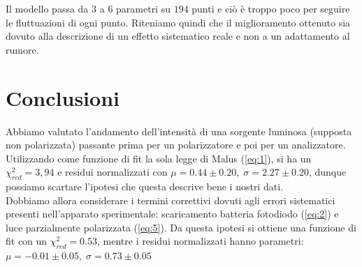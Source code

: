 \documentclass[10pt,twocolumn]{article}
\begin{document}
      \noindent Il modello passa da $3$ a $6$ parametri su $194$ punti e ciò è troppo poco per seguire le fluttuazioni di ogni punto.
      Riteniamo quindi che il miglioramento ottenuto sia dovuto alla descrizione di un effetto sistematico reale e non a un adattamento al rumore.


\section{Conclusioni}
Abbiamo valutato l'andamento dell'intensità di una sorgente luminosa (supposta non polarizzata) passante prima per un polarizzatore e poi per un analizzatore. Utilizzando come funzione di fit la sola legge di Malus (\ref{eq:1}), si ha un $\chi^2_{red} = 3,94$ e residui normalizzati con $\mu = 0.44 \pm 0.20, \; \sigma = 2.27 \pm 0.20$, dunque possiamo scartare l'ipotesi che questa descrive bene i nostri dati. \\
Dobbiamo allora considerare i termini correttivi dovuti agli errori sistematici presenti nell'apparato sperimentale: scaricamento batteria fotodiodo (\ref{eq:2}) e luce parzialmente polarizzata (\ref{eq:5}). Da questa ipotesi si ottiene una funzione di fit con un $\chi^2_{red} = 0.53$, mentre i residui normalizzati hanno parametri: $\mu = -0.01 \pm 0.05, \; \sigma = 0.73 \pm 0.05$
\end{document}
